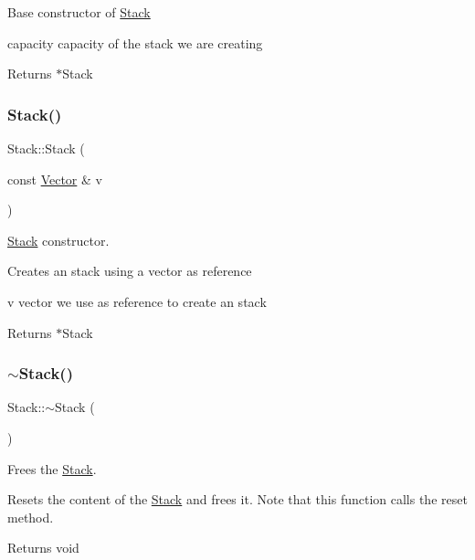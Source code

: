 Base constructor of \hyperlink{class_stack}{Stack}

capacity capacity of the stack we are creating \begin{DoxyReturn}{Returns}
$\ast$\+Stack 
\end{DoxyReturn}
\mbox{\label{class_stack_ae06d731c1b3802e21c211d8118945667}} 
\subsubsection{\texorpdfstring{Stack()}{Stack()}\hspace{0.1cm}{\footnotesize\ttfamily [2/3]}}
{\footnotesize\ttfamily Stack\+::\+Stack (\begin{DoxyParamCaption}\item[{const \hyperlink{class_vector}{Vector} \&}]{v }\end{DoxyParamCaption})}



\hyperlink{class_stack}{Stack} constructor. 

Creates an stack using a vector as reference

v vector we use as reference to create an stack \begin{DoxyReturn}{Returns}
$\ast$\+Stack 
\end{DoxyReturn}
\mbox{\label{class_stack_a40bd5dff912f0e5290777c4b46d17809}} 
\subsubsection{\texorpdfstring{$\sim$\+Stack()}{~Stack()}}
{\footnotesize\ttfamily Stack\+::$\sim$\+Stack (\begin{DoxyParamCaption}{ }\end{DoxyParamCaption})}



Frees the \hyperlink{class_stack}{Stack}. 

Resets the content of the \hyperlink{class_stack}{Stack} and frees it. Note that this function calls the reset method.

\begin{DoxyReturn}{Returns}
void 
\end{DoxyReturn}
\mbox{\label{class_stack_a44d3a06cb431d4e657197d01e10414f8}} 
